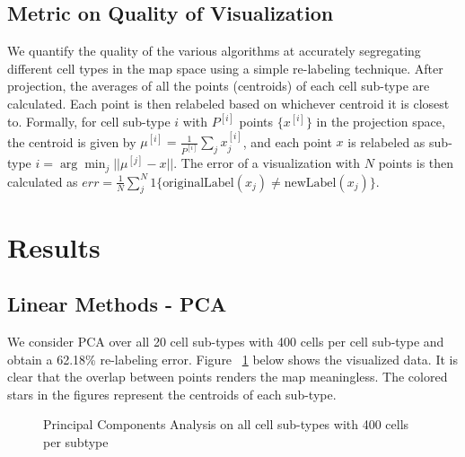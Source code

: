 \documentclass{article}
\begin{document}
\subsection{Metric on Quality of Visualization}
We quantify the quality of the various algorithms at accurately segregating different cell types in the map space using a simple re-labeling technique. After projection, the averages of all the points (centroids) of each cell sub-type are calculated. Each point is then relabeled based on whichever centroid it is closest to. Formally, for cell sub-type $i$ with $P^{[i]}$ points $\{x^{[i]}\}$ in the projection space, the centroid is given by $\mu^{[i]} = \frac{1}{P^{[i]}} \sum_{j} x_j^{[i]}$, and each point $x$ is relabeled as sub-type $i = \arg \min_j ||\mu^{[j]} - x||$. The error of a visualization with $N$ points is then calculated as $err = \frac{1}{N} \sum_j^N 1\{\text{originalLabel}(x_j) \neq \text{newLabel}(x_j) \}$.

\section{Results}

\subsection{Linear Methods - PCA}
We consider PCA over all 20 cell sub-types with 400 cells per cell sub-type and obtain a 62.18\% re-labeling error. Figure ~\ref{pca_plots_allcells} below shows the visualized data. It is clear that the overlap between points renders the map meaningless. The colored stars in the figures represent the centroids of each sub-type.

\begin{figure}[h]
\vskip 0.2in
\begin{center}
\quad
{}\quad
\end{center}
\caption{Principal Components Analysis on all cell sub-types with 400 cells per subtype}
\label{pca_plots_allcells}
\vskip 0.2in
\end{figure}
\end{document}
